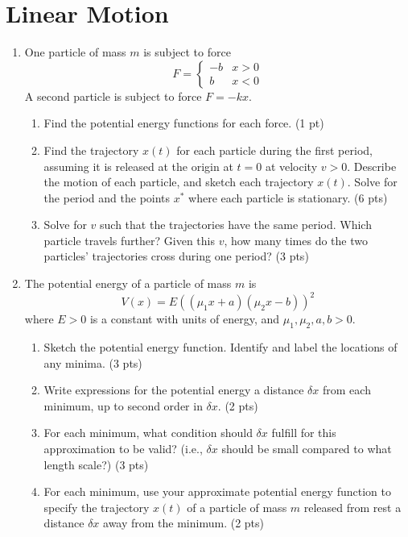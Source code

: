\documentclass[../psets.tex]{subfiles}
\begin{document}
\section{Linear Motion}
\begin{enumerate}
    \item {}One particle of mass $m$ is subject to force
    \begin{equation*}
        F =
        \begin{cases}
            -b & x>0\\
            b & x<0
        \end{cases}
    \end{equation*}
    A second particle is subject to force $F=-kx$.
    \begin{enumerate}
        \item Find the potential energy functions for each force. (1 pt)
        \item Find the trajectory $x(t)$ for each particle during the first period, assuming it is released at the origin at $t=0$ at velocity $v>0$. Describe the motion of each particle, and sketch each trajectory $x(t)$. Solve for the period and the points $x^*$ where each particle is stationary. (6 pts)
        \item Solve for $v$ such that the trajectories have the same period. Which particle travels further? Given this $v$, how many times do the two particles' trajectories cross during one period? (3 pts)
    \end{enumerate}
    \item The potential energy of a particle of mass $m$ is
    \begin{equation*}
        V(x) = E((\mu_1x+a)(\mu_2x-b))^2
    \end{equation*}
    where $E>0$ is a constant with units of energy, and $\mu_1,\mu_2,a,b>0$.
    \begin{enumerate}
        \item Sketch the potential energy function. Identify and label the locations of any minima. (3 pts)
        \item Write expressions for the potential energy a distance $\delta x$ from each minimum, up to second order in $\delta x$. (2 pts)
        \item For each minimum, what condition should $\delta x$ fulfill for this approximation to be valid? (i.e., $\delta x$ should be small compared to what length scale?) (3 pts)
        \item For each minimum, use your approximate potential energy function to specify the trajectory $x(t)$ of a particle of mass $m$ released from rest a distance $\delta x$ away from the minimum. (2 pts)

\end{enumerate}
\end{enumerate}
\end{document}
